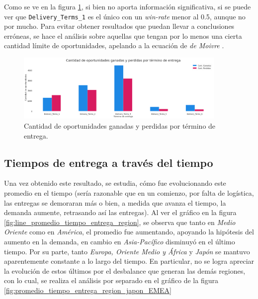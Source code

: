 \documentclass[titlepage,a4paper]{article}
\begin{document}
Como se ve en la figura \ref{fig:bp_oportunidades_ganadas_y_perdidas_por_termino_de_entrega}, si bien no aporta información significativa, si se puede ver que \verb|Delivery_Terms_1| es el único con un \textit{win-rate} menor al 0.5, aunque no por mucho. Para evitar obtener resultados que puedan llevar a conclusiones erróneas, se hace el análisis sobre aquellas que tengan por lo menos una cierta cantidad límite de oportunidades, apelando a la ecuación de \textit{de Moivre} \cite{la_ecuacion_mas_peligrosa}.
\begin{figure}[H]
\centering
\includegraphics[width=0.9\textwidth]{images/bp_oportunidades_ganadas_y_perdidas_por_termino_de_entrega.png}
\cprotect\caption{\label{fig:bp_oportunidades_ganadas_y_perdidas_por_termino_de_entrega} Cantidad de oportunidades ganadas y perdidas por término de entrega. }
\end{figure}


\subsection{Tiempos de entrega a través del tiempo}
Una vez obtenido este resultado, se estudia, cómo fue evolucionando este promedio en el tiempo (sería razonable que en un comienzo, por falta de logística, las entregas se demoraran más o bien, a medida que avanza el tiempo, la demanda aumente, retrasando así las entregas). Al ver el gráfico en la figura \ref{fig:line_promedio_tiempo_entrega_region}, se observa que tanto en \textit{Medio Oriente} como en \textit{América}, el promedio fue aumentando, apoyando la hipótesis del aumento en la demanda, en cambio en \textit{Asia-Pacífico} disminuyó en el último tiempo. Por su parte, tanto \textit{Europa, Oriente Medio y África} y \textit{Japón} se mantuvo aparentemente constante a lo largo del tiempo. En particular, no se logra apreciar la evolución de estos últimos por el desbalance que generan las demás regiones, con lo cual, se realiza el análisis por separado en el gráfico de la figura \ref{fig:promedio_tiempo_entrega_region_japon_EMEA}
\end{document}

